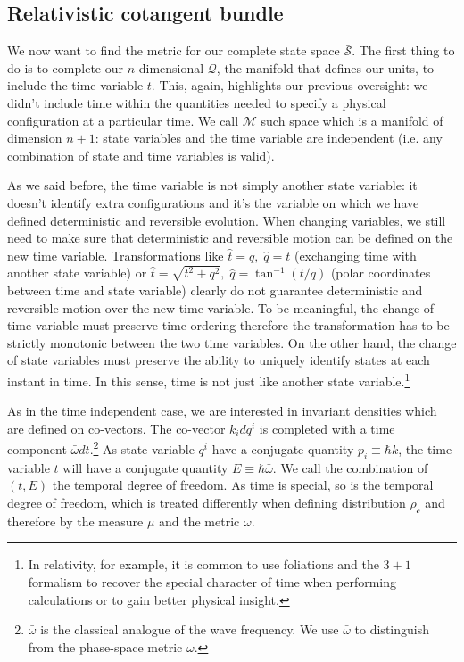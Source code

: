 \documentclass[aps,pra,10pt,twocolumn,floatfix,nofootinbib]{revtex4-1}
\numberwithin{equation}{section}
\theoremstyle{definition}
\begin{document}
\subsection{Relativistic cotangent bundle}

We now want to find the metric for our complete state space $\bar{\mathcal{S}}$. The first thing to do is to complete our $n$-dimensional $\mathcal{Q}$, the manifold that defines our units, to include the time variable $t$. This, again, highlights our previous oversight: we didn't include time within the quantities needed to specify a physical configuration at a particular time. We call $\mathcal{M}$ such space which is a manifold of dimension $n+1$: state variables and the time variable are independent (i.e. any combination of state and time variables is valid).

As we said before, the time variable is not simply another state variable: it doesn't identify extra configurations and it's the variable on which we have defined deterministic and reversible evolution. When changing variables, we still need to make sure that deterministic and reversible motion can be defined on the new time variable. Transformations like $\hat{t}=q, \; \hat{q}=t$ (exchanging time with another state variable) or $\hat{t}=\sqrt{t^2 + q^2}, \; \hat{q}=\tan^{-1}(t/q)$ (polar coordinates between time and state variable) clearly do not guarantee deterministic and reversible motion over the new time variable. To be meaningful, the change of time variable must preserve time ordering therefore the transformation has to be strictly monotonic between the two time variables. On the other hand, the change of state variables must preserve the ability to uniquely identify states at each instant in time. In this sense, time is not just like another state variable.\footnote{In relativity, for example, it is common to use foliations and the $3+1$ formalism to recover the special character of time when performing calculations or to gain better physical insight.}

As in the time independent case, we are interested in invariant densities which are defined on co-vectors. The co-vector $k_i dq^i$ is completed with a time component $\bar{\omega} dt$.\footnote{$\bar{\omega}$ is the classical analogue of the wave frequency. We use $\bar{\omega}$ to distinguish from the phase-space metric $\omega$.} As state variable $q^i$ have a conjugate quantity $p_i\equiv \hbar k$, the time variable $t$ will have a conjugate quantity $E\equiv\hbar\bar{\omega}$. We call the combination of $(t, E)$ the temporal degree of freedom. As time is special, so is the temporal degree of freedom, which is treated differently when defining distribution $\rho_\mathcal{c}$ and therefore by the measure $\mu$ and the metric $\omega$.
\end{document}
